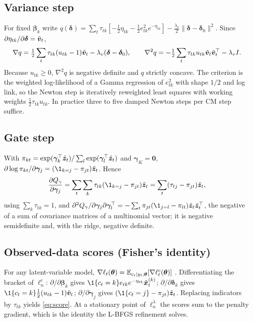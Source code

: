 \subsection{Variance step}
For fixed $\bm\beta_k$ write $q(\bm\delta)=\sum_t\tau_{tk}[-\tfrac12\eta_{tk}-\tfrac12e^2_{tk}e^{-\eta_{tk}}]-\tfrac{\lambda_v}{2}\|\bm\delta-\bm\delta_0\|^2$.
Since $\partial\eta_{tk}/\partial\bm\delta=\tilde{\bm{v}}_t$,
\[
\nabla q=\tfrac12\sum_t\tau_{tk}(u_{tk}-1)\tilde{\bm{v}}_t-\lambda_v(\bm\delta-\bm\delta_0),\qquad
\nabla^2q=-\tfrac12\sum_t\tau_{tk}u_{tk}\tilde{\bm{v}}_t\tilde{\bm{v}}_t^\top-\lambda_vI .
\]
Because $u_{tk}\ge0$, $\nabla^2q$ is negative definite and $q$ strictly concave. The criterion is the
weighted log-likelihood of a Gamma regression of $e^2_{tk}$ with shape $1/2$ and log link, so the
Newton step is iteratively reweighted least squares with working weights $\tfrac12\tau_{tk}u_{tk}$.
In practice three to five damped Newton steps per CM step suffice.

\subsection{Gate step}
With $\pi_{kt}=\exp(\bm\gamma_k^\top\tilde{\bm{z}}_t)/\sum_l\exp(\bm\gamma_l^\top\tilde{\bm{z}}_t)$ and
$\bm\gamma_K=\bm0$,
$\partial\log\pi_{kt}/\partial\bm\gamma_j=(\1_{k=j}-\pi_{jt})\tilde\bz_t$. Hence
\[
\frac{\partial Q_\gamma}{\partial\bm\gamma_j}=\sum_t\sum_k\tau_{tk}(\1_{k=j}-\pi_{jt})\tilde\bz_t
=\sum_t(\tau_{tj}-\pi_{jt})\tilde\bz_t,
\]
using $\sum_k\tau_{tk}=1$, and
$\partial^2Q_\gamma/\partial\bm\gamma_j\partial\bm\gamma_l^\top=-\sum_t\pi_{jt}(\1_{j=l}-\pi_{lt})\tilde\bz_t\tilde\bz_t^\top$,
the negative of a sum of covariance matrices of a multinomial vector; it is negative semidefinite and,
with the ridge, negative definite.

\subsection{Observed-data scores (Fisher's identity)}
For any latent-variable model,
$\nabla\ell_t(\bm{\theta})=\mathbb{E}_{c_t\mid y_t;\bm{\theta}}[\nabla\ell^c_t(\bm{\theta})]$ \citep{louis1982finding}.
Differentiating the bracket of $\ell^c_n$:
$\partial/\partial\bm\beta_k$ gives $\1\{c_t=k\}e_{tk}e^{-\eta_{tk}}\tilde\bx^{(k)}_t$;
$\partial/\partial\bm\delta_k$ gives $\1\{c_t=k\}\tfrac12(u_{tk}-1)\tilde\bv_t$;
$\partial/\partial\bm\gamma_j$ gives $(\1\{c_t=j\}-\pi_{jt})\tilde\bz_t$. Replacing indicators by
$\tau_{tk}$ yields \eqref{eq:score}. At a stationary point of $\ell^\lambda_n$ the scores sum to the
penalty gradient, which is the identity the L-BFGS refinement solves.

